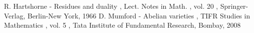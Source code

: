  R. Hartshorne - Residues and duality , Lect. Notes in Math. , vol. 20 , Springer-Verlag, Berlin-New York, 1966
 D. Mumford - Abelian varieties , TIFR Studies in Mathematics , vol. 5 , Tata Institute of Fundamental Research, Bombay, 2008
